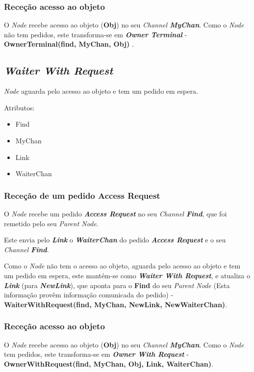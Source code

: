 \subsubsection*{Receção acesso ao objeto}
O \emph{Node} recebe acesso ao objeto (\textbf{Obj}) no seu \emph{Channel \textbf{MyChan}}.
Como o \emph{Node} não tem pedidos, este transforma-se em \textbf{\emph{Owner Terminal}} - \textbf{ OwnerTerminal(find, MyChan, Obj) }.




\subsection{\emph{Waiter With Request}}
\label{especificacao:nodes:waiter_with_request}

\emph{Node} aguarda pelo acesso ao objeto e tem um pedido em espera.


Atributos:
\begin{itemize}
    \item Find 
    \item MyChan 
    \item Link 
    \item WaiterChan 
\end{itemize}



\subsubsection*{Receção de um pedido Access Request}
O \emph{Node} recebe um pedido \emph{\textbf{Access Request}} no seu \emph{Channel \textbf{Find}}, que foi remetido pelo seu \emph{Parent Node}.

Este envia pelo \textbf{\emph{Link}} o \textbf{\emph{WaiterChan}} do pedido \emph{\textbf{Access Request}} e o seu \emph{Channel \textbf{Find}}.

Como o \emph{Node} não tem o acesso ao objeto, aguarda pelo acesso ao objeto e tem um pedido em espera, este mantém-se como \emph{\textbf{Waiter With Request}}, e atualiza o \textbf{\emph{Link}} (para \textbf{\emph{NewLink}}), que aponta para o \textbf{Find} do seu \emph{Parent Node} (Esta informação provêm informação comunicada do pedido) - \textbf{WaiterWithRequest(find, MyChan, NewLink, NewWaiterChan)}.


\subsubsection*{Receção acesso ao objeto}
O \emph{Node} recebe acesso ao objeto (\textbf{Obj}) no seu \emph{Channel \textbf{MyChan}}.
Como o \emph{Node} tem pedidos, este transforma-se em \textbf{\emph{Owner With Request}} - \textbf{OwnerWithRequest(find, MyChan, Obj, Link, WaiterChan)}.



